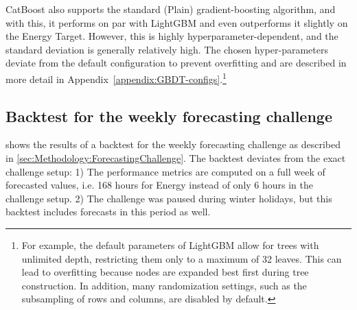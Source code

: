 CatBoost also supports the standard (Plain) gradient-boosting algorithm,
and with this, it performs on par with LightGBM and even outperforms it slightly on
the Energy Target. However, this is highly hyperparameter-dependent, and the standard
deviation is generally relatively high. The chosen hyper-parameters deviate from the default 
configuration to prevent overfitting and are described in more detail in Appendix~\ref{appendix:GBDT-configs}.\footnote{For example, the default parameters of LightGBM allow for trees with unlimited depth, restricting them only to a maximum of 32 leaves. This can lead to overfitting because nodes are expanded best first during tree construction. In addition, many randomization settings, such as the subsampling of rows and columns, are disabled by default.}


\subsection{Backtest for the weekly forecasting challenge}
\label{sec:Results:Backtest}

 shows the results of a backtest for the weekly forecasting challenge as described in \cref{sec:Methodology:ForecastingChallenge}. The backtest deviates from the exact challenge setup: 1) The performance metrics are computed on a full week of forecasted values, i.e. 168 hours for Energy instead of only 6 hours in the challenge setup. 2) The challenge was paused during winter holidays, but this backtest includes forecasts in this period as well.


